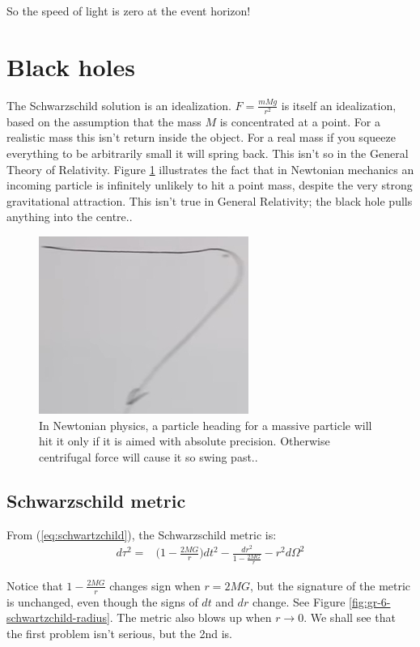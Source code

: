 \documentclass[]{article}
\begin{document}
{So the speed of light is zero at the event horizon!


\section{Black holes}


The Schwarzschild solution is an idealization. $F = \frac{mMg}{r^2}$ is itself an idealization, based on the assumption that the mass $M$ is concentrated at a point. For a realistic mass this isn't return inside the object. For a real mass if you squeeze everything to be arbitrarily small it will spring back. This isn't so in the General Theory of Relativity. Figure \ref{fig:gr-6-centrifugal-force} illustrates the fact that in Newtonian mechanics an incoming particle is infinitely unlikely to hit a point mass, despite the very strong gravitational attraction. This isn't true in General Relativity; the black hole pulls anything into the centre..

\begin{figure}[H]
	\caption[Centrifugal force]{In Newtonian physics, a particle heading for a massive particle will hit it only if it is aimed with absolute precision. Otherwise centrifugal force will cause it so swing past..}\label{fig:gr-6-centrifugal-force}
	\includegraphics{gr-6-centrifugal-force}
\end{figure} 

\subsection{Schwarzschild metric}

From (\ref{eq:schwartzchild}), the Schwarzschild metric is:
\begin{align*}
	d \tau^2 =&\bigg(1-\frac{2MG}{r}\bigg)dt^2-\frac{dr^2}{1-\frac{2MG}{r}} - r^2 d\Omega^2 
\end{align*}

Notice that $1-\frac{2MG}{r}$ changes sign when $r=2MG$, but the signature of the metric is unchanged, even though the signs of $dt$ and $dr$ change. See Figure \ref{fig:gr-6-schwartzchild-radius}. The metric also blows up when $r\rightarrow0$. We shall see that the first problem isn't serious, but the 2nd is.

}
\end{document}
